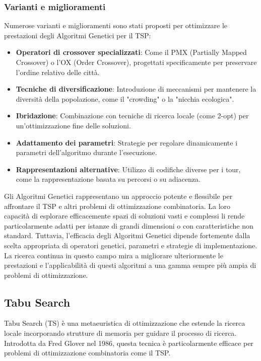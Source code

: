 \subsubsection{Varianti e miglioramenti}

Numerose varianti e miglioramenti sono stati proposti per ottimizzare le prestazioni degli Algoritmi Genetici per il \gls{TSP}:

\begin{itemize}
	\item \textbf{Operatori di crossover specializzati}: Come il \gls{PMX} (Partially Mapped Crossover) o l'\gls{OX} (Order Crossover), progettati specificamente per preservare l'ordine relativo delle città.
	\item \textbf{Tecniche di diversificazione}: Introduzione di meccanismi per mantenere la diversità della popolazione, come il "crowding" o la "nicchia ecologica".
	\item \textbf{Ibridazione}: Combinazione con tecniche di ricerca locale (come 2-opt) per un'ottimizzazione fine delle soluzioni.
	\item \textbf{Adattamento dei parametri}: Strategie per regolare dinamicamente i parametri dell'algoritmo durante l'esecuzione.
	\item \textbf{Rappresentazioni alternative}: Utilizzo di codifiche diverse per i tour, come la rappresentazione basata su percorsi o su adiacenza.
\end{itemize}


Gli Algoritmi Genetici rappresentano un approccio potente e flessibile per affrontare il \gls{TSP} e altri problemi di ottimizzazione combinatoria. La loro capacità di esplorare efficacemente spazi di soluzioni vasti e complessi li rende particolarmente adatti per istanze di grandi dimensioni o con caratteristiche non standard. Tuttavia, l'efficacia degli Algoritmi Genetici dipende fortemente dalla scelta appropriata di operatori genetici, parametri e strategie di implementazione. La ricerca continua in questo campo mira a migliorare ulteriormente le prestazioni e l'applicabilità di questi algoritmi a una gamma sempre più ampia di problemi di ottimizzazione.

\subsection{Tabu Search}

Tabu Search (\gls{TS}) è una metaeuristica di ottimizzazione che estende la ricerca locale incorporando strutture di memoria per guidare il processo di ricerca. Introdotta da Fred Glover nel 1986, questa tecnica è particolarmente efficace per problemi di ottimizzazione combinatoria come il \gls{TSP}.

